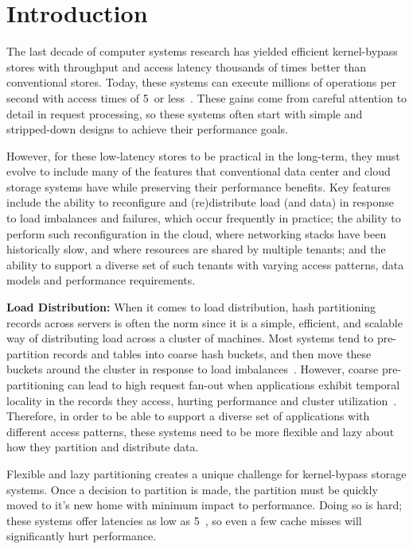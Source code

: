 \chapter{Introduction}

The last decade of computer systems research has yielded efficient
kernel-bypass stores with throughput and access latency thousands
of times better than conventional stores.
%
Today,
these systems can execute millions of operations per second
with access
times of 5~\us or less~\cite{mica,ramcloud,farm-2014}.
%
%
These gains come from careful attention to detail in request processing,
so these systems often start with simple and stripped-down designs to
achieve their performance goals.

However, for these low-latency stores to be practical in the long-term,
they must evolve to
include many of the features that conventional data center and cloud
storage systems have while preserving their performance benefits.
%
Key features include the ability to reconfigure and (re)distribute load
(and data) in
response to load imbalances and failures, which occur frequently in
practice;
%
the ability to perform such reconfiguration in the cloud, where
networking stacks have been
historically slow, and where resources are shared by
multiple tenants;
%
and the ability to support a diverse set of such tenants with varying
access patterns, data models and performance requirements.

\textbf{Load Distribution:}
When it comes to load distribution, hash partitioning records across
servers is often the norm since
it is a simple, efficient, and scalable way of distributing load across
a cluster of machines.
%
Most systems tend to pre-partition records and tables into coarse hash
buckets, and then move these buckets around the cluster in response to
load imbalances~\cite{dynamo}.
%
However, coarse pre-partitioning can lead to high request fan-out when
applications exhibit temporal locality in the records they access,
hurting performance and cluster
utilization~\cite{rocksteady}.
%
Therefore, in order to be able to support a diverse set of applications
with different access patterns, these systems need to be more flexible
and lazy about how they partition and distribute data.

Flexible and lazy partitioning creates a unique challenge for
kernel-bypass storage systems.
%
Once a decision to partition is made, the partition must be quickly
moved to it’s new home with minimum impact to performance.
%
Doing so is hard; these
systems offer latencies as low as 5~\us,
so even a few cache misses will significantly hurt
performance.

